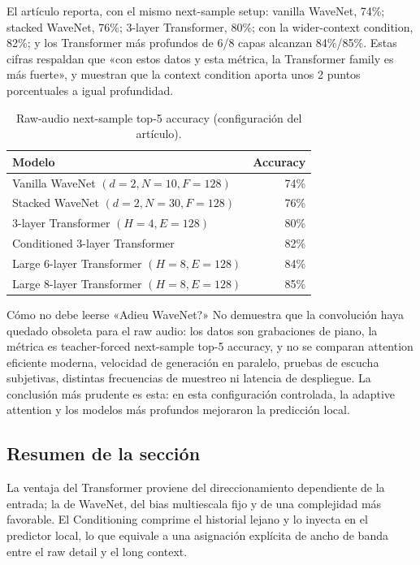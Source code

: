 El artículo reporta, con el mismo next-sample setup: vanilla WaveNet, 74\%; stacked WaveNet, 76\%; 3-layer Transformer, 80\%; con la wider-context condition, 82\%; y los Transformer más profundos de 6/8 capas alcanzan 84\%/85\%. Estas cifras respaldan que «con estos datos y esta métrica, la Transformer family es más fuerte», y muestran que la context condition aporta unos 2 puntos porcentuales a igual profundidad.


\begin{table}[H]
\centering
\small
\caption{Raw-audio next-sample top-5 accuracy (configuración del artículo).}
\begin{tabular}{lr}
\toprule
Modelo & Accuracy \\
\midrule
Vanilla WaveNet $(d=2,N=10,F=128)$ & 74\% \\
Stacked WaveNet $(d=2,N=30,F=128)$ & 76\% \\
3-layer Transformer $(H=4,E=128)$ & 80\% \\
Conditioned 3-layer Transformer & 82\% \\
Large 6-layer Transformer $(H=8,E=128)$ & 84\% \\
Large 8-layer Transformer $(H=8,E=128)$ & 85\% \\
\bottomrule
\end{tabular}
\end{table}


\begin{warningbox}{Cómo no debe leerse «Adieu WaveNet?»}
No demuestra que la convolución haya quedado obsoleta para el raw audio: los datos son grabaciones de piano, la métrica es teacher-forced next-sample top-5 accuracy, y no se comparan attention eficiente moderna, velocidad de generación en paralelo, pruebas de escucha subjetivas, distintas frecuencias de muestreo ni latencia de despliegue. La conclusión más prudente es esta: en esta configuración controlada, la adaptive attention y los modelos más profundos mejoraron la predicción local.
\end{warningbox}

\subsection{Resumen de la sección}

La ventaja del Transformer proviene del direccionamiento dependiente de la entrada; la de WaveNet, del bias multiescala fijo y de una complejidad más favorable. El Conditioning comprime el historial lejano y lo inyecta en el predictor local, lo que equivale a una asignación explícita de ancho de banda entre el raw detail y el long context.
